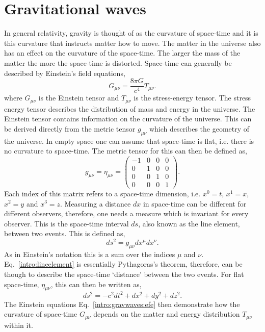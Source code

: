 \section{\label{intro:gravwaves}Gravitational waves}

In general relativity, gravity is thought of as the curvature of space-time and it is this curvature that instructs matter how to move. 
The matter in the universe also has an effect on the curvature of the space-time.
The larger the mass of the matter the more the space-time is distorted.
Space-time can generally be described by Einstein's field equations,
\begin{equation}
\label{intro:gravwaves:efe}
    G_{\mu \nu} = \frac{8 \pi G}{c^4}T_{\mu \nu}.
\end{equation}
where $G_{\mu \nu}$ is the Einstein tensor and $T_{\mu \nu}$ is the stress-energy tensor.
The stress energy tensor describes the distribution of mass and energy in the universe. 
The Einstein tensor contains information on the curvature of the universe. 
This can be derived directly from the metric tensor $g_{\mu \nu}$ which describes the geometry of the universe.
In empty space one can assume that space-time is flat, i.e. there is no curvature to space-time. The metric tensor for this can then be defined as,
\begin{equation}
g_{\mu \nu} = \eta_{\mu \nu} = \left(
\begin{matrix}
-1 & 0 & 0 & 0 \\
0 & 1 & 0 & 0 \\
0 & 0 & 1 & 0 \\
0 & 0 & 0 & 1 
\end{matrix}
\right).
\end{equation}
Each index of this matrix refers to a space-time dimension, i.e. $x^0 = t$, $x^1=x$, $x^2=y$ and $x^3=z$. 
Measuring a distance $dx$ in space-time can be different for different observers, therefore, one needs a measure which is invariant for every observer. 
This is the space-time interval $ds$, also known as the line element, between two events. 
This is defined as,
\begin{equation}
\label{intro:lineelement}
    ds^2 = g_{\mu \nu} dx^{\mu}dx^{\nu}.
\end{equation}
As in Einstein's notation this is a sum over the indices $\mu$ and $\nu$.  
Eq.~\ref{intro:lineelement} is essentially Pythagoras's theorem, therefore, can be though to describe the space-time `distance' between the two events.
For flat space-time, $\eta_{\mu\nu}$, this can then be written as,
\begin{equation}
    ds^2 = -c^2 dt^2 + dx^2 + dy^2 + dz^2.
\end{equation}
The Einstein equations Eq.~\ref{intro:gravwaves:efe} then demonstrate how the curvature of space-time $G_{\mu\nu}$ depends on the matter and energy distribution $T_{\mu \nu}$ within it.

